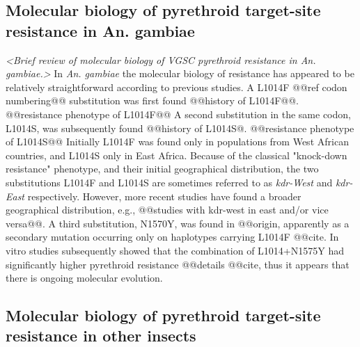 \documentclass[a4paper,11pt,abstracton,hidelinks]{scrartcl}
\begin{document}
\subsection*{Molecular biology of pyrethroid target-site resistance in An. gambiae}


\textit{<Brief review of molecular biology of VGSC pyrethroid resistance in An. gambiae.>}
%
In \textit{An. gambiae} the molecular biology of resistance has appeared to be relatively straightforward according to previous studies.
%
A L1014F @@ref codon numbering@@ substitution was first found @@history of L1014F@@.
%
@@resistance phenotype of L1014F@@
%
A second substitution in the same codon, L1014S, was subsequently found @@history of L1014S@.
%
@@resistance phenotype of L1014S@@
%
Initially L1014F was found only in populations from West African countries, and L1014S only in East Africa.
%
Because of the classical "knock-down resistance" phenotype, and their initial geographical distribution, the two substitutions L1014F and L1014S are sometimes referred to as \textit{kdr-West} and \textit{kdr-East} respectively.
%
However, more recent studies have found a broader geographical distribution, e.g., @@studies with kdr-west in east and/or vice versa@@.
%
A third substitution, N1570Y, was found in @@origin, apparently as a secondary mutation occurring only on haplotypes carrying L1014F @@cite.
%
In vitro studies subsequently showed that the combination of L1014+N1575Y had significantly higher pyrethroid resistance @@details @@cite, thus it appears that there is ongoing molecular evolution.


\subsection*{Molecular biology of pyrethroid target-site resistance in other insects}
\end{document}
